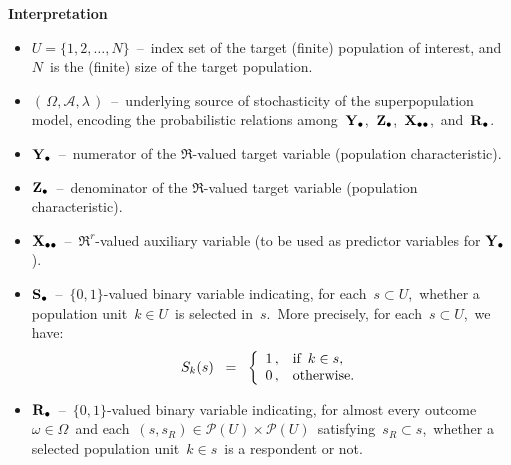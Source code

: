 \vskip 0.2cm
\noindent
\textbf{Interpretation}
\begin{itemize}
\item
    $U = \{1,2,\ldots,N\}$
    \,--\,
    index set of the target (finite) population of interest,
    and \,$N$\, is the (finite) size of the target population.
\item
    $\left(\,\Omega,\mathscr{A},\lambda\,\right)$
    \,--\,
    underlying source of stochasticity of the superpopulation model,
    encoding the probabilistic relations among
    \,$\mathbf{Y}_{\bullet}$,\, $\mathbf{Z}_{\bullet}$,\, $\mathbf{X}_{\bullet\bullet}$,\, and \,$\mathbf{R}_{\bullet}$.\,
\item
    $\mathbf{Y}_{\bullet}$
    \,--\,
    numerator of the $\Re$-valued target variable (population characteristic).
\item
    $\mathbf{Z}_{\bullet}$
    \,--\,
    denominator of the $\Re$-valued target variable (population characteristic).
\item
    $\mathbf{X}_{\bullet\bullet}$
    \,--\,
    $\Re^{r}$-valued auxiliary variable (to be used as predictor variables for $\mathbf{Y}_{\bullet}$).
\item
    $\mathbf{S}_{\bullet}$
    \,--\,
    $\{0,1\}$-valued binary variable indicating, for each \,$s \subset U$,\,
    whether a population unit \,$k \in U$\, is selected in \,$s$.\,
    More precisely, for each \,$s \subset U$,\, we have:
    \begin{equation*}
    S_{k}(s)
    \;\; = \;\;
        \left\{\begin{array}{cl}
            1\,, & \textnormal{if \,$k \in s$},
            \\
            0\,, & \textnormal{otherwise}.
            \end{array}\right.
    \end{equation*}
\item
    $\mathbf{R}_{\bullet}$
    \,--\,
    $\{0,1\}$-valued binary variable indicating, for almost every outcome
    \,$\omega \in \Omega$\,
    and each
    \,$(s,s_{R}) \in \mathcal{P}(U) \times \mathcal{P}(U)$\,
    satisfying
    \,$s_{R} \subset s$,\,
    whether a selected population unit \,$ k \in s$\,
    is a respondent or not.
\end{itemize}

